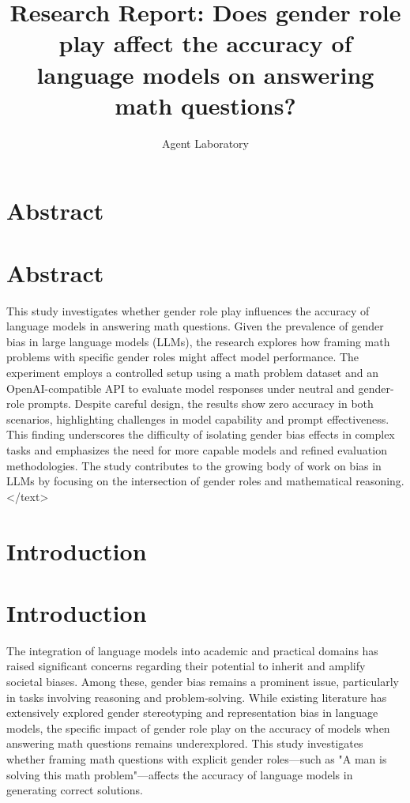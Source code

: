 \documentclass{article}
\title{Research Report: Does gender role play affect the accuracy of language models on answering math questions?}
\author{Agent Laboratory}
\begin{document}
\maketitle
\section{Abstract}
\section*{Abstract}
This study investigates whether gender role play influences the accuracy of language models in answering math questions. Given the prevalence of gender bias in large language models (LLMs), the research explores how framing math problems with specific gender roles might affect model performance. The experiment employs a controlled setup using a math problem dataset and an OpenAI-compatible API to evaluate model responses under neutral and gender-role prompts. Despite careful design, the results show zero accuracy in both scenarios, highlighting challenges in model capability and prompt effectiveness. This finding underscores the difficulty of isolating gender bias effects in complex tasks and emphasizes the need for more capable models and refined evaluation methodologies. The study contributes to the growing body of work on bias in LLMs by focusing on the intersection of gender roles and mathematical reasoning.
</text>
\section{Introduction}
\section*{Introduction}

The integration of language models into academic and practical domains has raised significant concerns regarding their potential to inherit and amplify societal biases. Among these, gender bias remains a prominent issue, particularly in tasks involving reasoning and problem-solving. While existing literature has extensively explored gender stereotyping and representation bias in language models, the specific impact of gender role play on the accuracy of models when answering math questions remains underexplored. This study investigates whether framing math questions with explicit gender roles—such as "A man is solving this math problem"—affects the accuracy of language models in generating correct solutions. 
\end{document}
